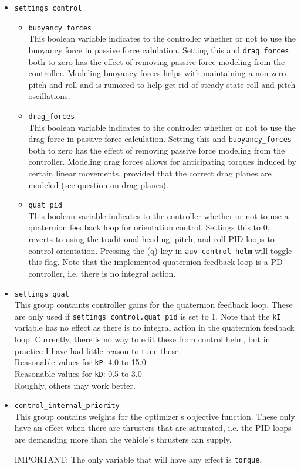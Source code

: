 \documentclass[11pt]{article}
\begin{document}
    \begin{itemize}
        \item \texttt{settings\_control}
            \begin{itemize}
                \item \texttt{buoyancy\_forces}\\
                This boolean variable indicates to the controller whether or not to use the buoyancy force in passive force calulation. Setting this and \texttt{drag\_forces} both to zero has the effect of removing passive force modeling from the controller. Modeling buoyancy forces helps with maintaining a non zero pitch and roll and is rumored to help get rid of steady state roll and pitch oscillations.
                \item \texttt{drag\_forces}\\
                This boolean variable indicates to the controller whether or not to use the drag force in passive force calculation. Setting this and \texttt{buoyancy\_forces} both to zero has the effect of removing passive force modeling from the controller. Modeling drag forces allows for anticipating torques induced by certain linear movements, provided that the correct drag planes are modeled (see question on drag planes).
                \item \texttt{quat\_pid}\\
                This boolean variable indicates to the controller whether or not to use a quaternion feedback loop for orientation control. Settings this to 0, reverts to using the traditional heading, pitch, and roll PID loops to control orientation. Pressing the (q) key in \texttt{auv-control-helm} will toggle this flag. Note that the implemented quaternion feedback loop is a PD controller, i.e. there is no integral action.
            \end{itemize}
       \item \texttt{settings\_quat}\\
           This group containts controller gains for the quaternion feedback loop. These are only used if \texttt{settings\_control.quat\_pid} is set to 1. Note that the \texttt{kI} variable has no effect as there is no integral action in the quaternion feedback loop. Currently, there is no way to edit these from control helm, but in practice I have had little reason to tune these.\\
           Reasonable values for \texttt{kP}: 4.0 to 15.0\\
           Reasonable values for \texttt{kD}: 0.5 to 3.0\\
           Roughly, others may work better.

       \item \texttt{control\_internal\_priority}\\
       This group contains weights for the optimizer's objective function. These only have an effect when there are thrusters that are saturated, i.e. the PID loops are demanding more than the vehicle's thrusters can supply.

       IMPORTANT: The only variable that will have any effect is \texttt{torque}.\\
           
\end{itemize}
\end{document}
